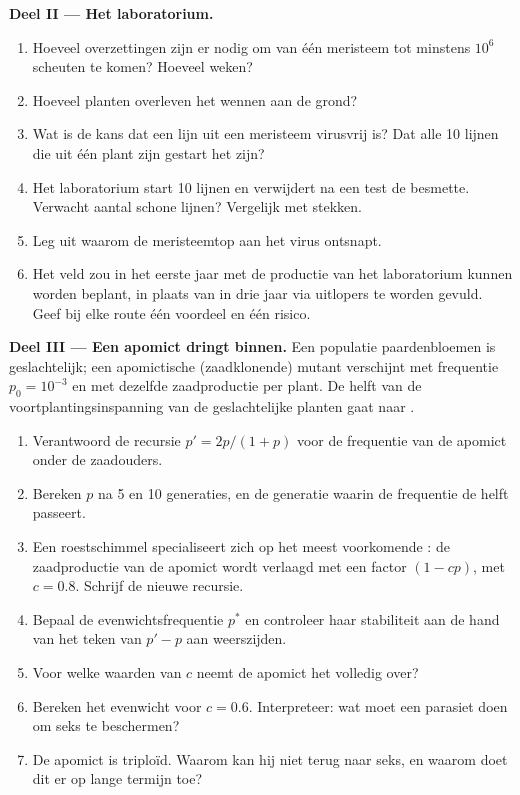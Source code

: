 \begin{problem}
\medskip
\noindent\textbf{Deel II --- Het laboratorium.}
\begin{enumerate}[resume]
  \item Hoeveel overzettingen zijn er nodig om van één meristeem tot
        minstens $10^{6}$ scheuten te komen? Hoeveel weken?
  \item Hoeveel planten overleven het wennen aan de grond?
  \item Wat is de kans dat een lijn uit een meristeem virusvrij is? Dat
        alle \num{10} lijnen die uit één plant zijn gestart het zijn?
  \item Het laboratorium start \num{10} lijnen en verwijdert na een test
        de besmette. Verwacht aantal schone lijnen? Vergelijk met stekken.
  \item Leg uit waarom de meristeemtop aan het virus ontsnapt.
  \item Het veld zou in het eerste jaar met de productie van het
        laboratorium kunnen worden beplant, in plaats van in drie jaar
        via uitlopers te worden gevuld. Geef bij elke route één voordeel
        en één risico.
\end{enumerate}

\medskip
\noindent\textbf{Deel III --- Een apomict dringt binnen.}
Een populatie paardenbloemen is geslachtelijk; een apomictische
(zaadklonende) mutant verschijnt met frequentie $p_0 = 10^{-3}$ en met
dezelfde zaadproductie per plant. De helft van de voortplantingsinspanning
van de geslachtelijke planten gaat naar .
\begin{enumerate}[resume]
  \item Verantwoord de recursie $p' = 2p/(1 + p)$ voor de frequentie van
        de apomict onder de zaadouders.
  \item Bereken $p$ na 5 en 10 generaties, en de generatie waarin de
        frequentie de helft passeert.
  \item Een roestschimmel specialiseert zich op het meest voorkomende
        : de zaadproductie van de apomict wordt verlaagd met een
        factor $(1 - cp)$, met
        $c = 0.8$. Schrijf de nieuwe recursie.
  \item Bepaal de evenwichtsfrequentie $p^*$ en controleer haar stabiliteit
        aan de hand van het teken van $p' - p$ aan weerszijden.
  \item Voor welke waarden van $c$ neemt de apomict het volledig over?
  \item Bereken het evenwicht voor $c = 0.6$. Interpreteer: wat moet een
        parasiet doen om seks te beschermen?
  \item De apomict is triploïd. Waarom kan hij niet terug naar seks, en
        waarom doet dit er op lange termijn toe?
\end{enumerate}


\end{problem}
